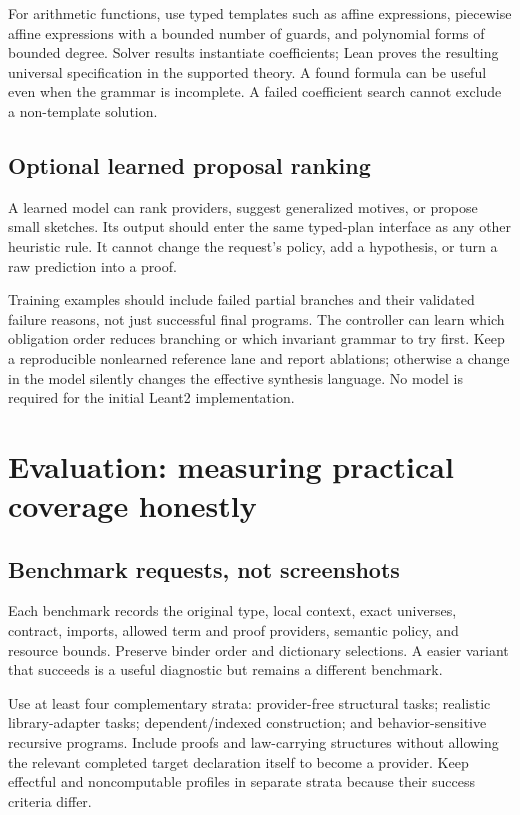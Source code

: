 For arithmetic functions, use typed templates such as affine expressions,
piecewise affine expressions with a bounded number of guards, and polynomial
forms of bounded degree. Solver results instantiate coefficients; Lean proves
the resulting universal specification in the supported theory. A found formula
can be useful even when the grammar is incomplete. A failed coefficient search
cannot exclude a non-template solution.

\subsection{Optional learned proposal ranking}

A learned model can rank providers, suggest generalized motives, or propose
small sketches. Its output should enter the same typed-plan interface as any
other heuristic rule. It cannot change the request's policy, add a hypothesis,
or turn a raw prediction into a proof.

Training examples should include failed partial branches and their validated
failure reasons, not just successful final programs. The controller can learn
which obligation order reduces branching or which invariant grammar to try
first. Keep a reproducible nonlearned reference lane and report ablations;
otherwise a change in the model silently changes the effective synthesis
language. No model is required for the initial Leant2 implementation.

\section{Evaluation: measuring practical coverage honestly}\label{sec:evaluation}

\subsection{Benchmark requests, not screenshots}

Each benchmark records the original type, local context, exact universes,
contract, imports, allowed term and proof providers, semantic policy, and
resource bounds. Preserve binder order and dictionary selections. A easier
variant that succeeds is a useful diagnostic but remains a different benchmark.

Use at least four complementary strata: provider-free structural tasks;
realistic library-adapter tasks; dependent/indexed construction; and
behavior-sensitive recursive programs. Include proofs and law-carrying
structures without allowing the relevant completed target declaration itself
to become a provider. Keep effectful and noncomputable profiles in separate
strata because their success criteria differ.

